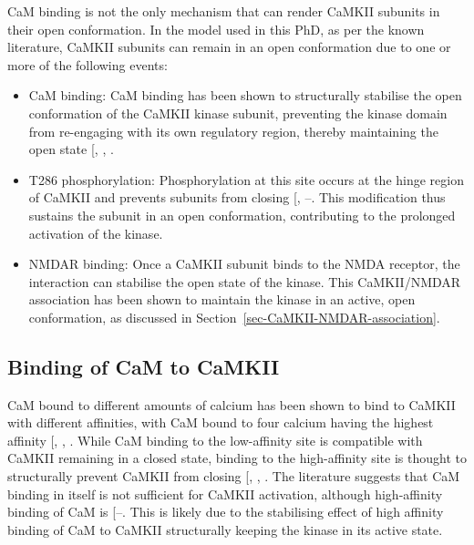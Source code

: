 \documentclass[
  11pt,
  letterpaper,
]{scrreprt}
\providecommand{\tightlist}{%
  \setlength{\itemsep}{0pt}\setlength{\parskip}{0pt}}\usepackage{longtable,booktabs,array}
\begin{document}
CaM binding is not the only mechanism that can render CaMKII subunits in
their open conformation. In the model used in this PhD, as per the known
literature, CaMKII subunits can remain in an open conformation due to
one or more of the following events:

\begin{itemize}
\tightlist
\item
  CaM binding: CaM binding has been shown to structurally stabilise the
  open conformation of the CaMKII kinase subunit, preventing the kinase
  domain from re-engaging with its own regulatory region, thereby
  maintaining the open state
  {[},
  ,
  \citeproc{ref-gaertner2004Comparative}{179}{]}.
\item
  T286 phosphorylation: Phosphorylation at this site occurs at the hinge
  region of CaMKII and prevents subunits from closing
  {[},
  --\citeproc{ref-buard2010CaMKII}{189}{]}.
  This modification thus sustains the subunit in an open conformation,
  contributing to the prolonged activation of the kinase.
\item
  NMDAR binding: Once a CaMKII subunit binds to the NMDA receptor, the
  interaction can stabilise the open state of the kinase. This
  CaMKII/NMDAR association has been shown to maintain the kinase in an
  active, open conformation, as discussed in
  Section~\ref{sec-CaMKII-NMDAR-association}.
\end{itemize}

\subsection{Binding of CaM to CaMKII}\label{sec-binding-cam-camkii}

CaM bound to different amounts of calcium has been shown to bind to
CaMKII with different affinities, with CaM bound to four calcium having
the highest affinity {[},
,
\citeproc{ref-khan2024Realtimea}{460}{]}. While CaM binding to the
low-affinity site is compatible with CaMKII remaining in a closed state,
binding to the high-affinity site is thought to structurally prevent
CaMKII from closing {[},
,
\citeproc{ref-gaertner2004Comparative}{179}{]}. The literature suggests
that CaM binding in itself is not sufficient for CaMKII activation,
although high-affinity binding of CaM is
{[}--\citeproc{ref-bossuyt2013Visualizing}{463}{]}.
This is likely due to the stabilising effect of high affinity binding of
CaM to CaMKII structurally keeping the kinase in its active state.
\end{document}
